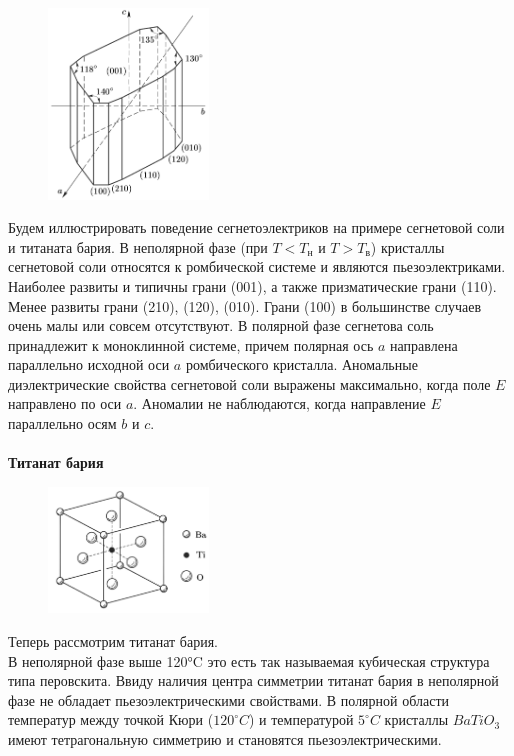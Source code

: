 \documentclass[12pt]{article}
\begin{document}
    \begin{figure}
        \centering
        \includegraphics[width=0.38\textwidth]{soli.png}
    \end{figure}
    Будем иллюстрировать поведение сегнетоэлектриков на примере сегнетовой соли и титаната бария. В неполярной фазе (при $T< T_{\text{н}}$ и $T>T_{\text{в}}$) кристаллы сегнетовой соли относятся к ромбической системе и являются пьезоэлектриками. Наиболее развиты и типичны грани (001), а также призматические грани (110). Менее развиты грани (210), (120), (010). Грани (100) в большинстве случаев очень малы или совсем отсутствуют.
    В полярной фазе сегнетова соль принадлежит к моноклинной системе, причем полярная ось $a$ направлена параллельно исходной оси $a$ ромбического кристалла. Аномальные диэлектрические свойства сегнетовой соли выражены максимально, когда поле $E$ направлено по оси $a$. Аномалии не наблюдаются, когда направление $E$ параллельно осям $b$ и $c$.\\
    \\
    \textbf{Титанат бария}\\
\begin{figure} %
    \centering
    \includegraphics[width=0.38\textwidth]{TiBa.png}
\end{figure}
Теперь рассмотрим титанат бария.\\
В неполярной фазе выше 120°C это есть так называемая кубическая структура типа перовскита. Ввиду наличия центра симметрии титанат бария в неполярной фазе не обладает пьезоэлектрическими свойствами. В полярной области температур между точкой Кюри ($120 ^\circ C$) и температурой $5 ^\circ C$ кристаллы $BaTiO_3$ имеют тетрагональную симметрию и становятся пьезоэлектрическими. 
\end{document}
